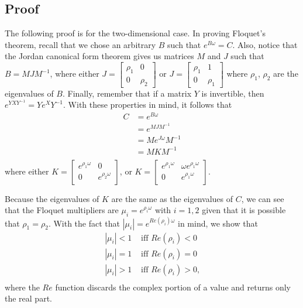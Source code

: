 \documentclass[a4paper]{article}
\begin{document}
\subsection{Proof}
The following proof is for the two-dimensional case. In proving Floquet's theorem, recall that we chose an arbitrary $B$ such that $e^{B \omega} = C$. 
Also, notice that the Jordan canonical form theorem gives us matrices $M$ and $J$ such that $B = MJM^{-1}$, where either $J = \begin{bmatrix}
    \rho_1 & 0 \\
    0 & \rho_2
\end{bmatrix}$ or $J = \begin{bmatrix}
    \rho_1 & 1 \\
    0 & \rho_1
\end{bmatrix}$ where $\rho_1$, $\rho_2$ are the eigenvalues of $B$. Finally, remember that if a matrix $Y$ is invertible, then $e^{Y X Y^{-1}} = Y e^{X} Y^{-1}.$
With these properties in mind, it follows that
\begin{equation*}
\begin{split}
    C &= e^{B\omega}\\
      &= e^{MJM^{-1}}\\
      &= M e^{J\omega} M^{-1}\\
      &= M K M^{-1}\\
\end{split}
\end{equation*}
where either $K = \begin{bmatrix}
    e^{\rho_{1}\omega} & 0 \\
    0 & e^{\rho_{2}\omega}\\
\end{bmatrix}$, or $K = \begin{bmatrix}
    e^{\rho_{1}\omega} & \omega e^{\rho_{1}\omega}\\
    0 & e^{\rho_{1}\omega}\\
\end{bmatrix}$.

Because the eigenvalues of $K$ are the same as the eigenvalues of $C$, we can see that the Floquet multipliers are $\mu_i = e^{\rho_{i}\omega}$ with $i = 1,2$ given that it is possible that $\rho_1 = \rho_2$. With the fact that $|\mu_i| = e^{Re(\rho_i)\omega}$ in mind, we show that 
\begin{equation*}
\begin{split}
    |\mu_i| < 1 &\text{ iff } Re(\rho_i) < 0 \\
    |\mu_i| = 1 &\text{ iff } Re(\rho_i) = 0 \\
    |\mu_i| > 1 &\text{ iff } Re(\rho_i) > 0\text{,} \\
\end{split}
\end{equation*} where the $Re$ function discards the complex portion of a value and returns only the real part.
\end{document}
